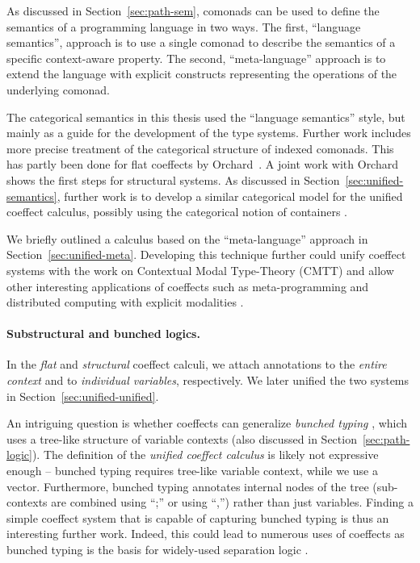 As discussed in Section~\ref{sec:path-sem}, comonads can be used to define the semantics of a
programming language in two ways. The first, ``language semantics'', approach is to use a
single comonad to describe the semantics of a specific context-aware property. The second,
``meta-language'' approach is to extend the language with explicit constructs representing the
operations of the underlying comonad.

The categorical semantics in this thesis used the ``language semantics'' style, but mainly as a
guide for the development of the type systems. Further work includes more precise treatment of
the categorical structure of indexed comonads. This has partly been done for flat coeffects by
Orchard~\cite{comonads-dom-thesis}. A joint work with Orchard~\cite{coeffects-icfp14} shows the
first steps for structural systems. As discussed in Section~\ref{sec:unified-semantics}, further
work is to develop a similar categorical model for the unified coeffect calculus, possibly using
the categorical notion of containers \cite{types-containers}.

We briefly outlined a calculus based on the ``meta-language'' approach in Section~\ref{sec:unified-meta}.
Developing this technique further could unify coeffect systems with the work on Contextual Modal
Type-Theory (CMTT) \cite{logic-cmtt} and allow other interesting applications of coeffects such
as meta-programming \cite{logic-cmtt} and distributed computing with explicit modalities \cite{app-distributed-ml5}.


\paragraph{Substructural and bunched logics.}

In the \emph{flat} and \emph{structural} coeffect calculi, we attach annotations to the \emph{entire
context} and to \emph{individual variables}, respectively. We later unified the two systems
in Section~\ref{sec:unified-unified}.

An intriguing question is whether coeffects can generalize \emph{bunched typing} \cite{substruct-bunched},
which uses a tree-like structure of variable contexts (also discussed in Section~\ref{sec:path-logic}).
The definition of the \emph{unified coeffect calculus} is likely not expressive enough -- bunched
typing requires tree-like variable context, while we use a vector. Furthermore, bunched typing
annotates internal nodes of the tree (sub-contexts are combined using ``;'' or using ``,'') rather
than just variables. Finding a simple coeffect system that is capable of capturing bunched typing
is thus an interesting further work. Indeed, this could lead to numerous uses of coeffects as
bunched typing is the basis for widely-used separation logic \cite{substruct-separation-logic}.

